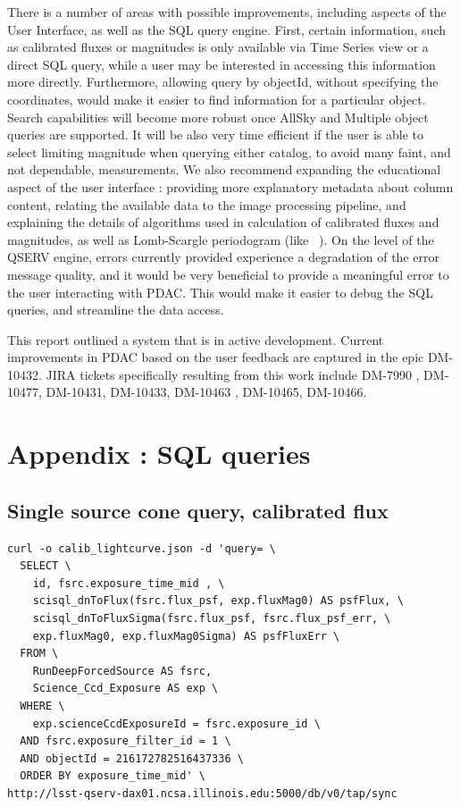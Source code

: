 \documentclass[DM,lsstdraft,toc,usenatbib]{lsstdoc}
\begin{document}
There is a number of areas with possible improvements,  including aspects of the User Interface, as well as the SQL query engine. First, certain information, such as calibrated fluxes or magnitudes is only available via Time Series view or a direct SQL query, while a user may be interested in accessing this information more directly.  Furthermore, allowing query by objectId, without specifying the coordinates, would make it easier to find information for a particular object.  Search capabilities will become more robust once AllSky and Multiple object queries are supported.  It will be also very time efficient if the user is able to select limiting magnitude when querying either catalog, to avoid many faint, and not dependable, measurements. We also recommend expanding the educational aspect of the user interface  : providing more explanatory metadata about column content, relating the available data to the image processing pipeline, and explaining the details of algorithms used in calculation of calibrated fluxes and magnitudes, as well as Lomb-Scargle periodogram (like ~\cite{vanderplas2017}). On the level of the QSERV engine,  errors currently provided  experience a degradation of the error message quality, and it would be very beneficial to provide a meaningful error to the user interacting with PDAC. This would make it easier to debug the SQL queries, and streamline the data access. 

This report outlined a system that is in active development. Current improvements in PDAC based on the user feedback are captured in the epic DM-10432. JIRA tickets specifically resulting from this work include DM-7990 , DM-10477, DM-10431, DM-10433, DM-10463 , DM-10465, DM-10466.

\appendix
\section{Appendix : SQL queries}

\subsection{Single source cone query, calibrated flux}
\label{sec:sql_single_flux}
\begin{lstlisting}
curl -o calib_lightcurve.json -d 'query= \
  SELECT \
    id, fsrc.exposure_time_mid , \
    scisql_dnToFlux(fsrc.flux_psf, exp.fluxMag0) AS psfFlux, \
    scisql_dnToFluxSigma(fsrc.flux_psf, fsrc.flux_psf_err, \
    exp.fluxMag0, exp.fluxMag0Sigma) AS psfFluxErr \
  FROM \
    RunDeepForcedSource AS fsrc, 
    Science_Ccd_Exposure AS exp \
  WHERE \
    exp.scienceCcdExposureId = fsrc.exposure_id \
  AND fsrc.exposure_filter_id = 1 \
  AND objectId = 216172782516437336 \
  ORDER BY exposure_time_mid' \
http://lsst-qserv-dax01.ncsa.illinois.edu:5000/db/v0/tap/sync
\end{lstlisting}
\end{document}
